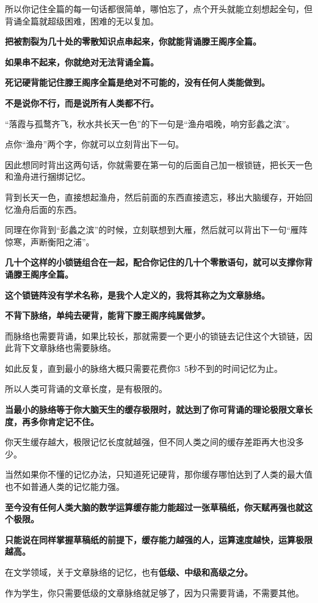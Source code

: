 \documentclass[UTF8, 11pt, oneside]{ctexart}
\newcommand{\zd}[1]{\textbf{\textcolor[RGB]{123,12,0}{#1}}} %
\begin{document}
所以你记住全篇的每一句话都很简单，哪怕忘了，点个开头就能立刻想起全句，但背诵全篇就超级困难，困难的无以复加。

\zd{把被割裂为几十处的零散知识点串起来，你就能背诵滕王阁序全篇。}

\zd{如果串不起来，你就绝对无法背诵全篇。}

\zd{死记硬背能记住滕王阁序全篇是绝对不可能的，没有任何人类能做到。}

\zd{不是说你不行，而是说所有人类都不行。}

“落霞与孤鹜齐飞，秋水共长天一色”的下一句是“渔舟唱晚，响穷彭蠡之滨”。

点你“渔舟”两个字，你就可以立刻背出下一句。

因此想同时背出这两句话，你就需要在第一句的后面自己加一根锁链，把长天一色和渔舟进行捆绑记忆。

背到长天一色，直接想起渔舟，然后前面的东西直接遗忘，移出大脑缓存，开始回忆渔舟后面的东西。

同理在你背到“彭蠡之滨”的时候，立刻联想到大雁，然后就可以背出下一句“雁阵惊寒，声断衡阳之浦”。

\zd{几十个这样的小锁链组合在一起，配合你记住的几十个零散语句，就可以支撑你背诵滕王阁序全篇。}

\zd{这个锁链阵没有学术名称，是我个人定义的，我将其称之为文章脉络。}

\zd{不背下脉络，单纯去硬背，能背下滕王阁序纯属做梦。}

而脉络也需要背诵，如果比较长，那就需要一个更小的锁链去记住这个大锁链，因此背下文章脉络也需要脉络。

如此反复，直到最小的脉络大概只需要花费你3~5秒不到的时间记忆为止。

所以人类可背诵的文章长度，是有极限的。

\zd{当最小的脉络等于你大脑天生的缓存极限时，就达到了你可背诵的理论极限文章长度，再多你肯定记不住。}

你天生缓存越大，极限记忆长度就越强，但不同人类之间的缓存差距再大也没多少。

当然如果你不懂的记忆办法，只知道死记硬背，那你缓存哪怕达到了人类的最大值也不如普通人类的记忆能力强。

\zd{至今没有任何人类大脑的数学运算缓存能力能超过一张草稿纸，你天赋再强也就这个极限。}

\zd{只能说在同样掌握草稿纸的前提下，缓存能力越强的人，运算速度越快，运算极限越高。}

在文学领域，关于文章脉络的记忆，也有\zd{低级、中级和高级之分。}

作为学生，你只需要低级的文章脉络就足够了，因为只需要背诵，不需要其他。
\end{document}
